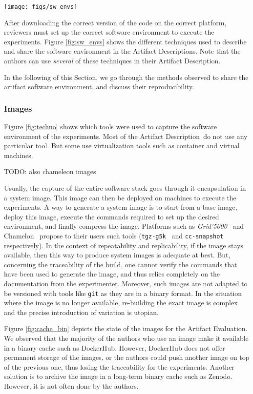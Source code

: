 \documentclass[sigconf,natbib=false]{acmart}
\newcommand{\grid}{\emph{Grid'5000}}
\newcommand{\ad}{Artifact Description}
\newcommand{\aeval}{Artifact Evaluation}
\newcommand{\todo}[1]{{\color{red}TODO: #1}}
\begin{document}
\begin{figure*}
  \centering
  \texttt{[image: figs/sw\_envs]}
  \caption{}\label{fig:sw_envs}
\end{figure*}

After downloading the correct version of the code on the correct platform, reviewers must set up the correct software environment to execute the experiments.
Figure \ref{fig:sw_envs} shows the different techniques used to describe and share the software environment in the \ad s.
Note that the authors can use \emph{several} of these techniques in their \ad.

In the following of this Section, we go through the methods observed to share the artifact software environment, and discuss their reproducibility.

\subsubsection{Images}

Figure \ref{fig:techno} shows which tools were used to capture the software environment of the experiments.
Most of the \ad\ do not use any particular tool.
But some use virtualization tools such as container and virtual machines.

\todo{also chameleon images}

Usually, the capture of the entire software stack goes through it encapsulation in a system image.
This image can then be deployed on machines to execute the experiments.
A way to generate a system image is to start from a base image, deploy this image, execute the commands required to set up the desired environment, and finally compress the image.
Platforms such as \grid\ \cite{grid5000} and Chamelon\ \cite{chameleon} propose to their users such tools (\texttt{tgz-g5k}\ \cite{tgz-g5k} and \texttt{cc-snapshot}\ \cite{cc-snapshot} respectively).
In the context of repeatability and replicability, if the image stays available, then this way to produce system images is adequate at best.
But, concerning the traceability of the build, one cannot verify the commands that have been used to generate the image, and thus relies completely on the documentation from the experimenter.
Moreover, such images are not adapted to be versioned with tools like \texttt{git} as they are in a binary format.
In the situation where the image is no longer available, re-building the exact image is complex and the precise introduction of variation is utopian.

Figure \ref{fig:cache_bin} depicts the state of the images for the \aeval.
We observed that the majority of the authors who use an image make it available in a binary cache such as DockerHub. 
However, DockerHub does not offer permanent storage of the images, or the authors could push another image on top of the previous one, thus losing the traceability for the experiments.
Another solution is to archive the image in a long-term binary cache such as Zenodo.
However, it is not often done by the authors.
\end{document}
